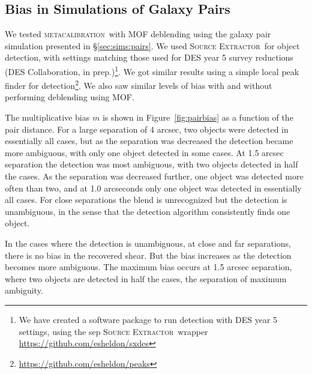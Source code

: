 \documentclass[iop, twocolappendix, appendixfloats, numberedappendix, apj]{hackemulateapj}
\newcommand{\mcal}{\textsc{metacalibration}}
\newcommand{\sx}{\textsc{Source Extractor}}
\begin{document}
\subsection{Bias in Simulations of Galaxy Pairs}

We tested \mcal\ with MOF deblending using the galaxy pair simulation presented
in \S \ref{sec:sims:pairs}. We used \sx\ for object detection, with settings
matching those used for DES year 5 survey reductions (DES Collaboration, in
prep.)\footnote{We have created a software package to run detection with DES
year 5 settings, using the sep \sx\ wrapper
\url{https://github.com/esheldon/sxdes}}.  We got similar results using a
simple local peak finder for
detection\footnote{\url{https://github.com/esheldon/peaks}}.  We also saw
similar levels of bias with and without performing deblending using MOF.

The multiplicative bias $m$ is shown in Figure~\ref{fig:pairbias} as a function
of the pair distance. For a large separation of 4 arcsec, two objects were
detected in essentially all cases, but as the separation was decreased the
detection became more ambiguous, with only one object detected in some cases.
At 1.5 arcsec separation the detection was most ambiguous, with two objects
detected in half the cases. As the separation was decreased further, one object
was detected more often than two, and at 1.0 arcseconds only one object was
detected in essentially all cases.  For close separations the blend is
unrecognized but the detection is unambiguous, in the sense that the
detection algorithm consistently finds one object.

In the cases where the detection is unambiguous, at close and far separations,
there is no bias in the recovered shear.  But the bias increases as the
detection becomes more ambiguous. The maximum bias occurs at 1.5 arcsec
separation, where two objects are detected in half the cases, the separation of
maximum ambiguity.
\end{document}
